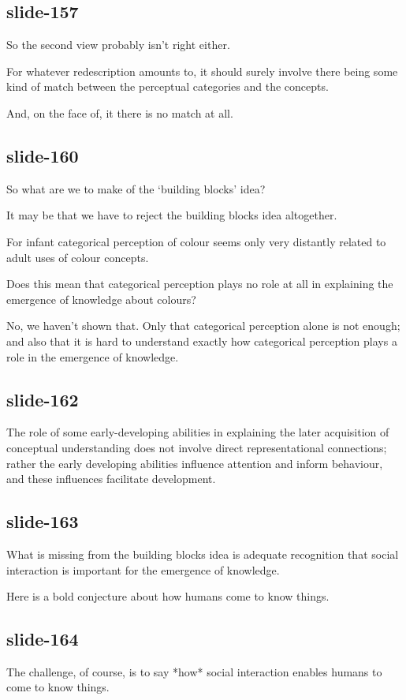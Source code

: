 \documentclass[12pt,\papersize]{extarticle}
\begin{document}
\subsection{slide-157}
So the second view probably isn't right either.
 
For whatever redescription amounts to, it should surely involve there being some kind of match between the perceptual categories and the concepts.
 
And, on the face of, it there is no match at all.
 
\subsection{slide-160}
So what are we to make of the ‘building blocks’ idea?
 
It may be that we have to reject the building blocks idea altogether.
 
For infant categorical perception of colour seems only very distantly related to adult uses of colour concepts.
 
Does this mean that categorical perception plays no role at all in explaining the emergence of knowledge about colours?
 
No, we haven't shown that.  Only that categorical perception alone is not enough; and also that  it is hard to understand exactly how categorical perception plays a role in the emergence of knowledge.
 
\subsection{slide-162}
The role of some early-developing abilities in explaining the later acquisition of conceptual 
understanding does not involve direct representational connections; rather the early developing 
abilities influence attention and inform behaviour, and these influences facilitate 
development.
 
\subsection{slide-163}
What is missing from the building blocks idea is adequate recognition that social interaction is 
important for the emergence of knowledge.
 
Here is a bold conjecture about how humans come to know things.
 
\subsection{slide-164}
The challenge, of course, is to say *how* social interaction enables humans to come to know 
things.
 
\end{document}
